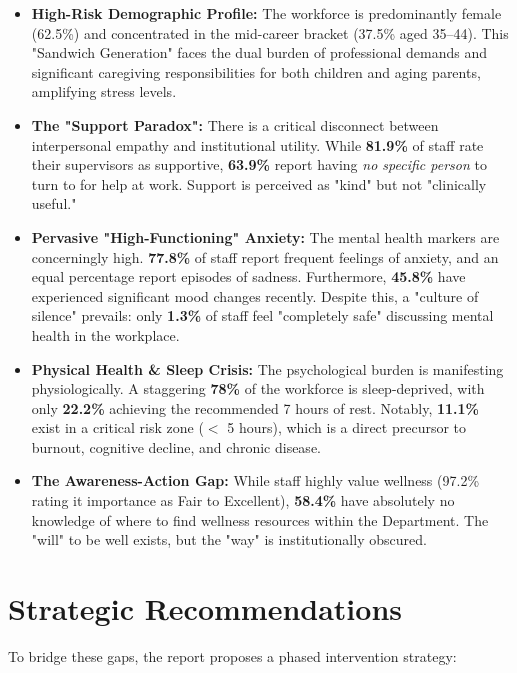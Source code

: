 \begin{itemize}
    \setlength\itemsep{0.5em}
    \item \textbf{High-Risk Demographic Profile:} The workforce is predominantly female (62.5\%) and concentrated in the mid-career bracket (37.5\% aged 35--44). This "Sandwich Generation" faces the dual burden of professional demands and significant caregiving responsibilities for both children and aging parents, amplifying stress levels.
    
    \item \textbf{The "Support Paradox":} There is a critical disconnect between interpersonal empathy and institutional utility. While \textbf{81.9\%} of staff rate their supervisors as supportive, \textbf{63.9\%} report having \textit{no specific person} to turn to for help at work. Support is perceived as "kind" but not "clinically useful."
    
    \item \textbf{Pervasive "High-Functioning" Anxiety:} The mental health markers are concerningly high. \textbf{77.8\%} of staff report frequent feelings of anxiety, and an equal percentage report episodes of sadness. Furthermore, \textbf{45.8\%} have experienced significant mood changes recently. Despite this, a "culture of silence" prevails: only \textbf{1.3\%} of staff feel "completely safe" discussing mental health in the workplace.
    
    \item \textbf{Physical Health \& Sleep Crisis:} The psychological burden is manifesting physiologically. A staggering \textbf{78\%} of the workforce is sleep-deprived, with only \textbf{22.2\%} achieving the recommended 7 hours of rest. Notably, \textbf{11.1\%} exist in a critical risk zone ($<$ 5 hours), which is a direct precursor to burnout, cognitive decline, and chronic disease.
    
    \item \textbf{The Awareness-Action Gap:} While staff highly value wellness (97.2\% rating it importance as Fair to Excellent), \textbf{58.4\%} have absolutely no knowledge of where to find wellness resources within the Department. The "will" to be well exists, but the "way" is institutionally obscured.
\end{itemize}

\vspace{0.5cm}
\section*{Strategic Recommendations}
\noindent To bridge these gaps, the report proposes a phased intervention strategy:

